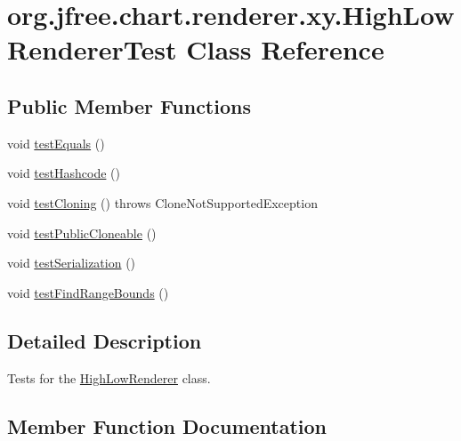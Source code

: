 \hypertarget{classorg_1_1jfree_1_1chart_1_1renderer_1_1xy_1_1_high_low_renderer_test}{}\section{org.\+jfree.\+chart.\+renderer.\+xy.\+High\+Low\+Renderer\+Test Class Reference}
\label{classorg_1_1jfree_1_1chart_1_1renderer_1_1xy_1_1_high_low_renderer_test}
\subsection*{Public Member Functions}
\begin{DoxyCompactItemize}
\item 
void \mbox{\hyperlink{classorg_1_1jfree_1_1chart_1_1renderer_1_1xy_1_1_high_low_renderer_test_a7ba924ba9b9a988faac78e990167859d}{test\+Equals}} ()
\item 
void \mbox{\hyperlink{classorg_1_1jfree_1_1chart_1_1renderer_1_1xy_1_1_high_low_renderer_test_a8bf933d20756bd823af92055d386215c}{test\+Hashcode}} ()
\item 
void \mbox{\hyperlink{classorg_1_1jfree_1_1chart_1_1renderer_1_1xy_1_1_high_low_renderer_test_aef85f44721993be5848db499c9001653}{test\+Cloning}} ()  throws Clone\+Not\+Supported\+Exception 
\item 
void \mbox{\hyperlink{classorg_1_1jfree_1_1chart_1_1renderer_1_1xy_1_1_high_low_renderer_test_a5e7b8382b96a5a3816e82f960756745c}{test\+Public\+Cloneable}} ()
\item 
void \mbox{\hyperlink{classorg_1_1jfree_1_1chart_1_1renderer_1_1xy_1_1_high_low_renderer_test_a39f4dae10ae18e1b1299a5254030b5fa}{test\+Serialization}} ()
\item 
void \mbox{\hyperlink{classorg_1_1jfree_1_1chart_1_1renderer_1_1xy_1_1_high_low_renderer_test_ad48533af8d4b61c5ffe5c27c13d0c83e}{test\+Find\+Range\+Bounds}} ()
\end{DoxyCompactItemize}


\subsection{Detailed Description}
Tests for the \mbox{\hyperlink{classorg_1_1jfree_1_1chart_1_1renderer_1_1xy_1_1_high_low_renderer}{High\+Low\+Renderer}} class. 

\subsection{Member Function Documentation}
\mbox{\label{classorg_1_1jfree_1_1chart_1_1renderer_1_1xy_1_1_high_low_renderer_test_aef85f44721993be5848db499c9001653}} 
